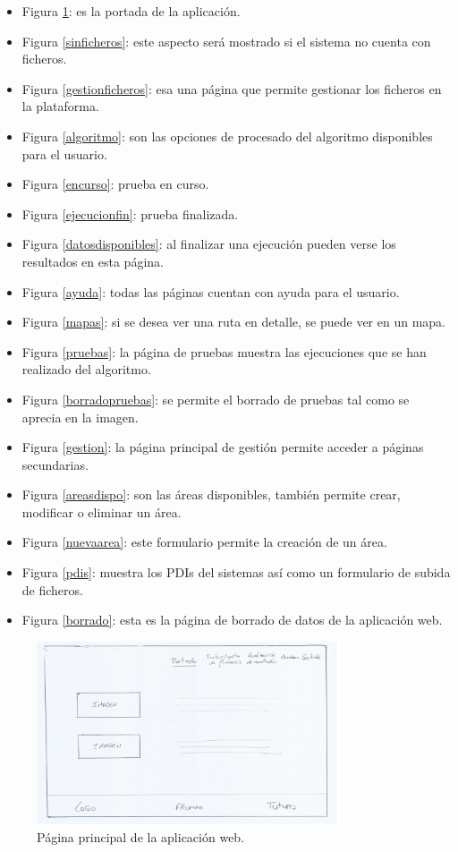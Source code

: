 \begin{itemize}
	\item Figura \ref{principal}: es la portada de la aplicación.
	\item Figura \ref{sinficheros}: este aspecto será mostrado si el sistema no cuenta con ficheros.
	\item Figura \ref{gestionficheros}: esa una página que permite gestionar los ficheros en la plataforma.
	\item Figura \ref{algoritmo}: son las opciones de procesado del algoritmo disponibles para el usuario.
	\item Figura \ref{encurso}: prueba en curso.
	\item Figura \ref{ejecucionfin}: prueba finalizada.
	\item Figura \ref{datosdisponibles}: al finalizar una ejecución pueden verse los resultados en esta página.
	\item Figura \ref{ayuda}: todas las páginas cuentan con ayuda para el usuario.
	\item Figura \ref{mapas}: si se desea ver una ruta en detalle, se puede ver en un mapa.
	\item Figura \ref{pruebas}: la página de pruebas muestra las ejecuciones que se han realizado del algoritmo.
	\item Figura \ref{borradopruebas}: se permite el borrado de pruebas tal como se aprecia en la imagen.
	\item Figura \ref{gestion}: la página principal de gestión permite acceder a páginas secundarias.
	\item Figura \ref{areasdispo}: son las áreas disponibles, también permite crear, modificar o eliminar un área.
	\item Figura \ref{nuevaarea}: este formulario permite la creación de un área.
	\item Figura \ref{pdis}: muestra los PDIs del sistemas así como un formulario de subida de ficheros.
	\item Figura \ref{borrado}:	esta es la página de borrado de datos de la aplicación web.	
\end{itemize}

\begin{figure}[!htbp]
  \centering
    \includegraphics[width=0.8\textwidth]{../img/prototipado/alta/principal.png}
  \caption{Página principal de la aplicación web.}
  \label{principal}
\end{figure}

